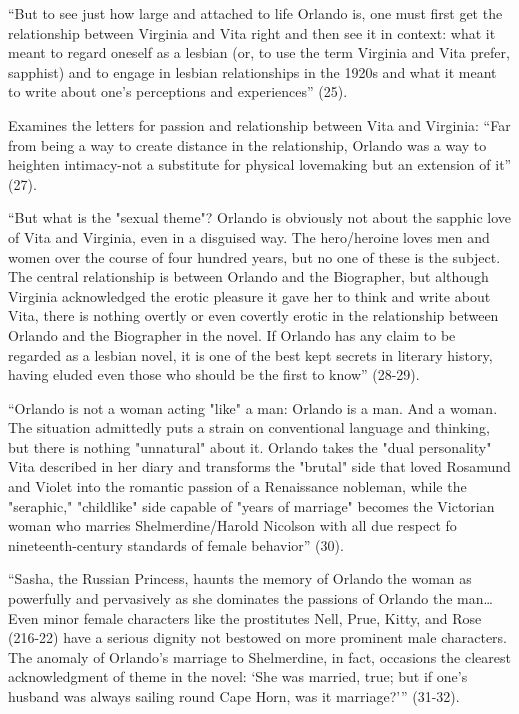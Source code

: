 \documentclass[11pt]{article}
\begin{document}
“But to see just how large and attached to life Orlando is, one must
first get the relationship between Virginia and Vita right and then
see it in context: what it meant to regard oneself as a lesbian (or,
to use the term Virginia and Vita prefer, sapphist) and to engage in
lesbian relationships in the 1920s and what it meant to write about
one's perceptions and experiences” (25).

Examines the letters for passion and relationship between Vita and
Virginia: “Far from being a way to create distance in the
relationship, Orlando was a way to heighten intimacy-not a substitute
for physical lovemaking but an extension of it” (27).

“But what is the "sexual theme"? Orlando is obviously not about the
sapphic love of Vita and Virginia, even in a disguised way. The
hero/heroine loves men and women over the course of four hundred
years, but no one of these is the subject. The central relationship is
between Orlando and the Biographer, but although Virginia acknowledged
the erotic pleasure it gave her to think and write about Vita, there
is nothing overtly or even covertly erotic in the relationship between
Orlando and the Biographer in the novel. If Orlando has any claim to
be regarded as a lesbian novel, it is one of the best kept secrets in
literary history, having eluded even those who should be the first to
know” (28-29).

“Orlando is not a woman acting "like" a man: Orlando is a man. And a
woman. The situation admittedly puts a strain on conventional language
and thinking, but there is nothing "unnatural" about it. Orlando takes
the "dual personality" Vita described in her diary and transforms the
"brutal" side that loved Rosamund and Violet into the romantic passion
of a Renaissance nobleman, while the "seraphic," "childlike" side
capable of "years of marriage" becomes the Victorian woman who marries
Shelmerdine/Harold Nicolson with all due respect fo nineteenth-century
standards of female behavior” (30).

“Sasha, the Russian Princess, haunts the memory of Orlando the woman
as powerfully and pervasively as she dominates the passions of Orlando
the man\ldots{}Even minor female characters like the prostitutes Nell,
Prue, Kitty, and Rose (216-22) have a serious dignity not bestowed on
more prominent male characters. The anomaly of Orlando's marriage to
Shelmerdine, in fact, occasions the clearest acknowledgment of theme
in the novel: ‘She was married, true; but if one's husband was always
sailing round Cape Horn, was it marriage?’” (31-32).
\end{document}
